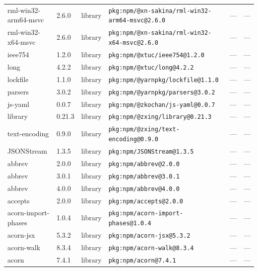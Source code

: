 \documentclass[11pt,a4paper]{article}
\begin{document}
\begin{longtable}{|p{4cm}|p{2cm}|p{1.6cm}|p{5cm}|p{1.5cm}|p{3.5cm}|}
\raggedright rml-win32-arm64-msvc & 2.6.0 & library & \small\texttt{pkg:npm/@xn-sakina/rml-win32-arm64-msvc@2.6.0} & — & \small — \\
\raggedright rml-win32-x64-msvc & 2.6.0 & library & \small\texttt{pkg:npm/@xn-sakina/rml-win32-x64-msvc@2.6.0} & — & \small — \\
\raggedright ieee754 & 1.2.0 & library & \small\texttt{pkg:npm/@xtuc/ieee754@1.2.0} & — & \small — \\
\raggedright long & 4.2.2 & library & \small\texttt{pkg:npm/@xtuc/long@4.2.2} & — & \small — \\
\raggedright lockfile & 1.1.0 & library & \small\texttt{pkg:npm/@yarnpkg/lockfile@1.1.0} & — & \small — \\
\raggedright parsers & 3.0.2 & library & \small\texttt{pkg:npm/@yarnpkg/parsers@3.0.2} & — & \small — \\
\raggedright js-yaml & 0.0.7 & library & \small\texttt{pkg:npm/@zkochan/js-yaml@0.0.7} & — & \small — \\
\raggedright library & 0.21.3 & library & \small\texttt{pkg:npm/@zxing/library@0.21.3} & — & \small — \\
\raggedright text-encoding & 0.9.0 & library & \small\texttt{pkg:npm/@zxing/text-encoding@0.9.0} & — & \small — \\
\raggedright JSONStream & 1.3.5 & library & \small\texttt{pkg:npm/JSONStream@1.3.5} & — & \small — \\
\raggedright abbrev & 2.0.0 & library & \small\texttt{pkg:npm/abbrev@2.0.0} & — & \small — \\
\raggedright abbrev & 3.0.1 & library & \small\texttt{pkg:npm/abbrev@3.0.1} & — & \small — \\
\raggedright abbrev & 4.0.0 & library & \small\texttt{pkg:npm/abbrev@4.0.0} & — & \small — \\
\raggedright accepts & 2.0.0 & library & \small\texttt{pkg:npm/accepts@2.0.0} & — & \small — \\
\raggedright acorn-import-phases & 1.0.4 & library & \small\texttt{pkg:npm/acorn-import-phases@1.0.4} & — & \small — \\
\raggedright acorn-jsx & 5.3.2 & library & \small\texttt{pkg:npm/acorn-jsx@5.3.2} & — & \small — \\
\raggedright acorn-walk & 8.3.4 & library & \small\texttt{pkg:npm/acorn-walk@8.3.4} & — & \small — \\
\raggedright acorn & 7.4.1 & library & \small\texttt{pkg:npm/acorn@7.4.1} & — & \small — \\

\end{longtable}
\end{document}
